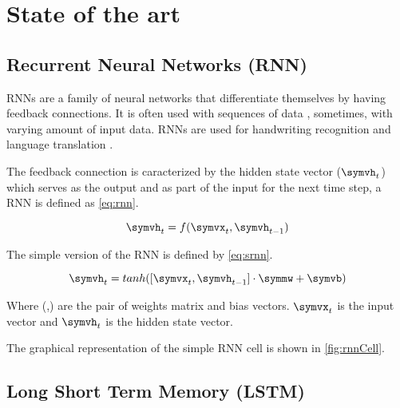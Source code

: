 \section{State of the art}\label{sec:state}

\subsection{Recurrent Neural Networks (RNN)}

RNNs are a family of neural networks that differentiate themselves by having feedback connections. It is often used with sequences of data \cite{rnn}, sometimes, with varying amount of input data. RNNs are used for handwriting recognition and language translation \cite{gru}.

The feedback connection is caracterized by the hidden state vector ($\symvh_t$) which serves as the output and as part of the input for the next time step, a RNN is defined as \cref{eq:rnn}.

\begin{equation}\label{eq:rnn}
  \symvh_t=f(\symvx_t,\symvh_{t-1})
\end{equation}

The simple version of the RNN is defined by \cref{eq:srnn}.

\begin{equation}\label{eq:srnn}
  \symvh_t=tanh([\symvx_t,\symvh_{t-1}]\cdot \symmw + \symvb)
\end{equation}

Where (\symmw,\symvb) are the pair of weights matrix and bias vectors. $\symvx_t$ is the input vector and $\symvh_t$ is the hidden state vector.

The graphical representation of the simple RNN cell is shown in \cref{fig:rnnCell}.

\begin{figure}[t]
  \centering
  \begin{minipage}{\columnwidth}
  \end{minipage}
  \begin{minipage}{\columnwidth}
  \end{minipage}
  \caption{}
\end{figure}

\subsection{Long Short Term Memory (LSTM)}

